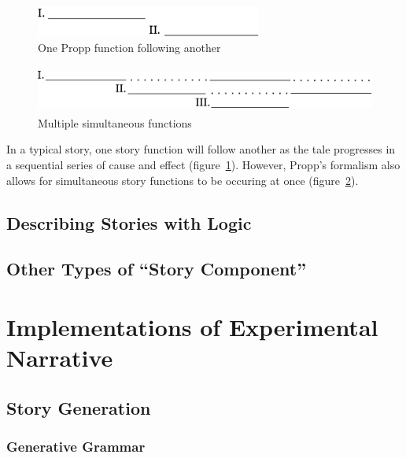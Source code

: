 \documentclass[11pt]{report}
\begin{document}
\begin{figure}[!t]
\centerline{\includegraphics[height=0.4in]{propp1.png}}
\caption{One Propp function following another}\label{fig:propp1}
\end{figure}

\begin{figure}[!t]
\centerline{\includegraphics[height=0.6in]{propp2.png}}
\caption{Multiple simultaneous functions}\label{fig:propp2}
\end{figure}

In a typical story, one story function will follow another as the tale progresses in a sequential series of cause and effect (figure~\ref{fig:propp1}). However, Propp's formalism also allows for simultaneous story functions to be occuring at once (figure~\ref{fig:propp2}).


\subsection{Describing Stories with Logic}

\subsection{Other Types of ``Story Component''}

\section{Implementations of Experimental Narrative}
\label{sec:implementations}

\subsection{Story Generation}

\subsubsection{Generative Grammar}
\end{document}
